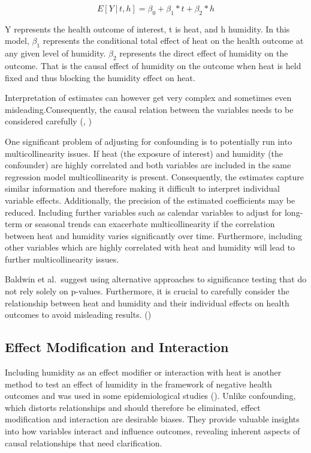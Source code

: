 \documentclass[
]{krantz}
\begin{document}
\[
Ε[Y│t,h]= β_0+ β_1*t+ β_2*h
\]

Y represents the health outcome of interest, t is heat, and h humidity. In this model, \(β_1\) represents the conditional total effect of heat on the health outcome at any given level of humidity. \(β_2\) represents the direct effect of humidity on the outcome. That is the causal effect of humidity on the outcome when heat is held fixed and thus blocking the humidity effect on heat.

Interpretation of estimates can however get very complex and sometimes even misleading.Consequently, the causal relation between the variables needs to be considered carefully (\citet{bald}, \citet{westreich})

One significant problem of adjusting for confounding is to potentially run into multicollinearity issues.
If heat (the exposure of interest) and humidity (the confounder) are highly correlated and both variables are included in the same regression model multicollinearity is present. Consequently, the estimates capture similar information and therefore making it difficult to interpret individual variable effects. Additionally, the precision of the estimated coefficients may be reduced. Including further variables such as calendar variables to adjust for long-term or seasonal trends can exacerbate multicollinearity if the correlation between heat and humidity varies significantly over time. Furthermore, including other variables which are highly correlated with heat and humidity will lead to further multicollinearity issues.

Baldwin et al.~suggest using alternative approaches to significance testing that do not rely solely on p-values. Furthermore, it is crucial to carefully consider the relationship between heat and humidity and their individual effects on health outcomes to avoid misleading results. (\citet{bald})

\subsection{Effect Modification and Interaction}\label{effect-modification-and-interaction}

Including humidity as an effect modifier or interaction with heat is another method to test an effect of humidity in the framework of negative health outcomes and was used in some epidemiological studies (\citet{bald}). Unlike confounding, which distorts relationships and should therefore be eliminated, effect modification and interaction are desirable biases. They provide valuable insights into how variables interact and influence outcomes, revealing inherent aspects of causal relationships that need clarification.
\end{document}
